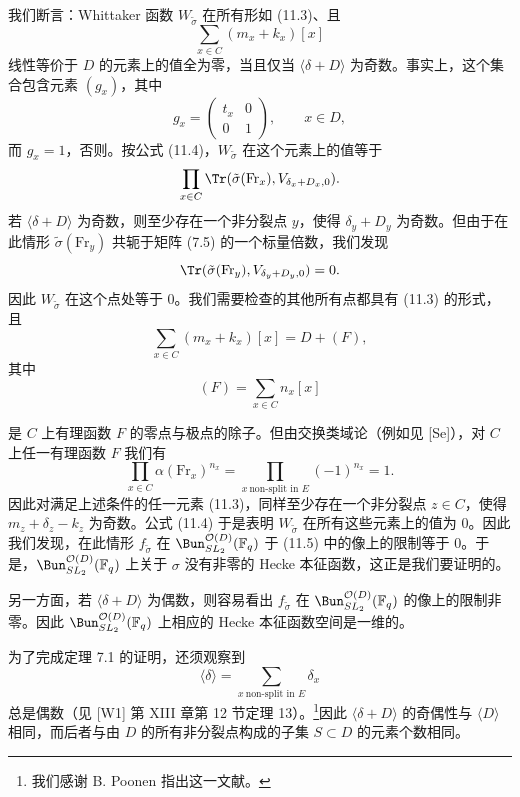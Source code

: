 我们断言：Whittaker 函数 $W_{\tilde\sigma}$ 在所有形如 (11.3)、且
\[
\sum_{x\in C}(m_x+k_x)[x]
\]
线性等价于 $D$ 的元素上的值全为零，当且仅当 $\langle\delta+D\rangle$ 为奇数。事实上，这个集合包含元素 $(g_x)$，其中
\[
g_x=\begin{pmatrix}t_x&0\\ 0&1\end{pmatrix},\qquad x\in D,
\]
而 $g_x=1$，否则。按公式 (11.4)，$W_{\tilde\sigma}$ 在这个元素上的值等于
\[
\prod_{x\in C}\Tr(\tilde\sigma(\mathrm{Fr}_x),V_{\delta_x+D_x,0}).
\]
若 $\langle\delta+D\rangle$ 为奇数，则至少存在一个非分裂点 $y$，使得 $\delta_y+D_y$ 为奇数。但由于在此情形 $\tilde\sigma(\mathrm{Fr}_y)$ 共轭于矩阵 (7.5) 的一个标量倍数，我们发现
\[
\Tr(\tilde\sigma(\mathrm{Fr}_y),V_{\delta_y+D_y,0})=0.
\]
因此 $W_{\tilde\sigma}$ 在这个点处等于 0。我们需要检查的其他所有点都具有 (11.3) 的形式，且
\[
\sum_{x\in C}(m_x+k_x)[x]=D+(F),
\]
其中
\[
(F)=\sum_{x\in C}n_x[x]
\]


是 $C$ 上有理函数 $F$ 的零点与极点的除子。但由交换类域论（例如见 [Se]），对 $C$ 上任一有理函数 $F$ 我们有
\begin{equation}\tag{11.6}
\prod_{x\in C}\alpha(\mathrm{Fr}_x)^{n_x}=\prod_{x\ \text{non-split in }E}(-1)^{n_x}=1.
\end{equation}
因此对满足上述条件的任一元素 (11.3)，同样至少存在一个非分裂点 $z\in C$，使得 $m_z+\delta_z-k_z$ 为奇数。公式 (11.4) 于是表明 $W_{\tilde\sigma}$ 在所有这些元素上的值为 0。因此我们发现，在此情形 $f_{\tilde\sigma}$ 在 $\Bun^{\mathcal{O}(D)}_{SL_2}(\mathbb{F}_q)$ 于 (11.5) 中的像上的限制等于 0。于是，$\Bun^{\mathcal{O}(D)}_{SL_2}(\mathbb{F}_q)$ 上关于 $\sigma$ 没有非零的 Hecke 本征函数，这正是我们要证明的。

另一方面，若 $\langle\delta+D\rangle$ 为偶数，则容易看出 $f_{\tilde\sigma}$ 在 $\Bun^{\mathcal{O}(D)}_{SL_2}(\mathbb{F}_q)$ 的像上的限制非零。因此 $\Bun^{\mathcal{O}(D)}_{SL_2}(\mathbb{F}_q)$ 上相应的 Hecke 本征函数空间是一维的。

为了完成定理 7.1 的证明，还须观察到
\[
\langle\delta\rangle = \sum_{x\ \text{non-split in }E}\delta_x
\]
总是偶数（见 [W1] 第 XIII 章第 12 节定理 13）。\footnote{我们感谢 B. Poonen 指出这一文献。}因此 $\langle\delta+D\rangle$ 的奇偶性与 $\langle D\rangle$ 相同，而后者与由 $D$ 的所有非分裂点构成的子集 $S\subset D$ 的元素个数相同。


